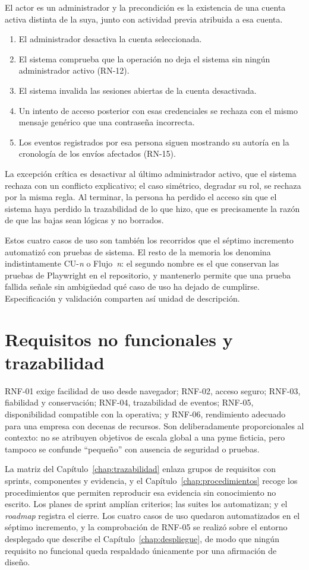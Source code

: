 El actor es un administrador y la precondición es la existencia de una cuenta activa distinta de la suya, junto con actividad previa atribuida a esa cuenta.

\begin{enumerate}
  \item El administrador desactiva la cuenta seleccionada.
  \item El sistema comprueba que la operación no deja el sistema sin ningún administrador activo (RN-12).
  \item El sistema invalida las sesiones abiertas de la cuenta desactivada.
  \item Un intento de acceso posterior con esas credenciales se rechaza con el mismo mensaje genérico que una contraseña incorrecta.
  \item Los eventos registrados por esa persona siguen mostrando su autoría en la cronología de los envíos afectados (RN-15).
\end{enumerate}

La excepción crítica es desactivar al último administrador activo, que el sistema rechaza con un conflicto explicativo; el caso simétrico, degradar su rol, se rechaza por la misma regla. Al terminar, la persona ha perdido el acceso sin que el sistema haya perdido la trazabilidad de lo que hizo, que es precisamente la razón de que las bajas sean lógicas y no borrados.

Estos cuatro casos de uso son también los recorridos que el séptimo incremento automatizó con pruebas de sistema. El resto de la memoria los denomina indistintamente CU-\emph{n} o Flujo~\emph{n}: el segundo nombre es el que conservan las pruebas de Playwright en el repositorio, y mantenerlo permite que una prueba fallida señale sin ambigüedad qué caso de uso ha dejado de cumplirse. Especificación y validación comparten así unidad de descripción.

\section{Requisitos no funcionales y trazabilidad}

RNF-01 exige facilidad de uso desde navegador; RNF-02, acceso seguro; RNF-03, fiabilidad y conservación; RNF-04, trazabilidad de eventos; RNF-05, disponibilidad compatible con la operativa; y RNF-06, rendimiento adecuado para una empresa con decenas de recursos. Son deliberadamente proporcionales al contexto: no se atribuyen objetivos de escala global a una pyme ficticia, pero tampoco se confunde ``pequeño'' con ausencia de seguridad o pruebas.

La matriz del Capítulo~\ref{chap:trazabilidad} enlaza grupos de requisitos con sprints, componentes y evidencia, y el Capítulo~\ref{chap:procedimientos} recoge los procedimientos que permiten reproducir esa evidencia sin conocimiento no escrito. Los planes de sprint amplían criterios; las suites los automatizan; y el \emph{roadmap} registra el cierre. Los cuatro casos de uso quedaron automatizados en el séptimo incremento, y la comprobación de RNF-05 se realizó sobre el entorno desplegado que describe el Capítulo~\ref{chap:despliegue}, de modo que ningún requisito no funcional queda respaldado únicamente por una afirmación de diseño.
